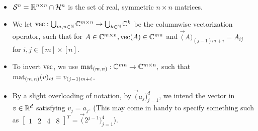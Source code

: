 \begin{itemize}
  \item $\mathcal{S}^n = \R^{n \times n} \cap \H^n$ is the set of real, symmetric $n \times n$ matrices.
  \item We let $\vec : \bigcup_{m, n \in \N} \C^{m \times n} \to \bigcup_{k \in \N} \C^k$ be the columnwise vectorization operator, such that for $A \in \C^{m \times n}, \vec(A) \in \C^{m n}$ and  $\vec(A)_{(j - 1) m + i} = A_{i j}$ for $i, j \in [m] \times [n]$.
  \item To invert $\vec$, we use $\mat_{(m, n)} : \C^{m n} \to \C^{m \times n},$ such that $\mat_{(m, n)}(v)_{ij} = v_{(j - 1) m + i}$.
  \item By a slight overloading of notation, by $\vec(a_j)_{j = 1}^d$, we intend the vector in $v \in \R^d$ satisfying $v_j = a_j$.  (This may come in handy to specify something such as $\begin{bmatrix} 1 & 2 & 4 & 8 \end{bmatrix}^T = \vec(2^{j - 1})_{j = 1}^4$).
    
    
\end{itemize}
